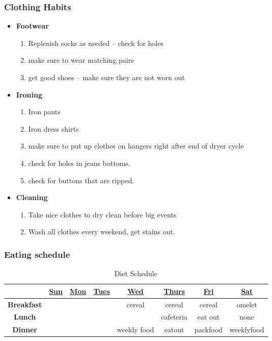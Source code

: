 \begin{frame}
\frametitle{Clothing Habits} 
\begin{itemize}
\item \textbf{Footwear}
\begin{enumerate} 
\item \tiny Replenish socks as needed -- check for holes
\item \tiny make sure to wear matching pairs
\item \tiny get good shoes -- make sure they are not worn out
\end{enumerate} 
\item \textbf{Ironing} 
\begin{enumerate}
\item \tiny Iron pants 
\item \tiny Iron dress shirts
\item \tiny make sure to put up clothes on hangers right after end of dryer cycle
\item \tiny check for holes in jeans bottoms.
\item \tiny check for buttons that are ripped. 
\end{enumerate}
\item \textbf{Cleaning} 
\begin{enumerate} 
\item \tiny Take nice clothes to dry clean before big events
\item \tiny Wash all clothes every weekend, get stains out. 
\end{enumerate} 
\end{itemize}
\end{frame} 

\begin{frame}
\frametitle{Eating schedule} 
\begin{table}[h!]
  \begin{center}
    \begin{tabular}{ | c | c c c c c c c |}
    \hline
    & \underline{Sun} & \underline{Mon} & \underline{Tues} & \underline{Wed} & \underline{Thurs} & \underline{Fri} & \underline{Sat} \\
    \hline
    \tiny \textbf{Breakfast}  &  \tiny   & \tiny  & \tiny  & \tiny cereal & \tiny cereal & \tiny cereal & \tiny omelet \\
    \tiny \textbf{Lunch} & \tiny   & \tiny  & \tiny   & \tiny   & \tiny cafeteria & \tiny eat out  & \tiny none \\ 
    \tiny \textbf{Dinner} & \tiny & \tiny  & \tiny & \tiny weekly food & \tiny eatout & \tiny packfood & \tiny weeklyfood \\ 
    \hline
    \end{tabular}
  \end{center}
  \caption{Diet Schedule}
\end{table}
\end{frame} 

